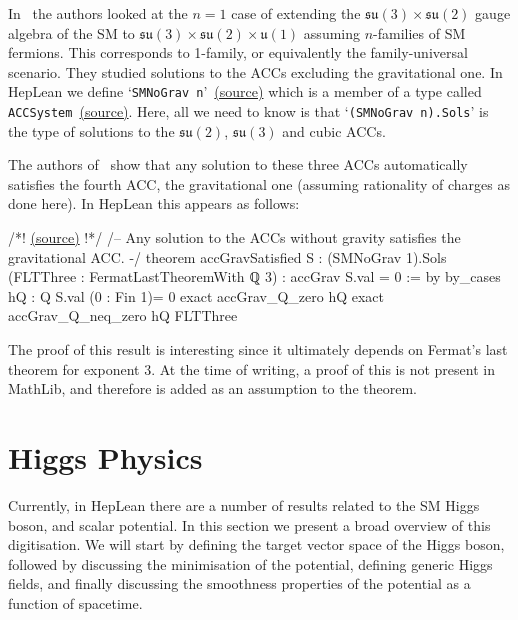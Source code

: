 \documentclass[a4paper, 11pt]{article}
\newcommand{\codeLink}[1]{
  \vspace{-0.5cm}\hfill\href{https://github.com/HEPLean/HepLean/blob/1b951994ae3d882242b02d23957ef1ee7fa05f3d/HepLean/#1}{(source)}
  }
\newcommand{\textLinkB}[1]{\href{https://github.com/HEPLean/HepLean/blob/1b951994ae3d882242b02d23957ef1ee7fa05f3d/HepLean/#1}{(source)}}
\begin{document}
In~\cite{LT19} the authors looked at the $n=1$ case of extending the $\mathfrak{su}(3)\times
\mathfrak{su}(2)$ gauge algebra of the SM to $\mathfrak{su}(3)\times \mathfrak{su}(2)
\times \mathfrak{u}(1)$ assuming $n$-families of SM fermions. This corresponds to 1-family, or
equivalently the family-universal scenario. They studied solutions to the ACCs excluding the
gravitational one. In HepLean we define  `\lstinline|SMNoGrav n|'~\textLinkB{AnomalyCancellation/SM/NoGrav/Basic.lean\#L21} which is a member of a type called
\lstinline|ACCSystem|~\textLinkB{AnomalyCancellation/Basic.lean\#L219}. Here, all we need to know is that  `\lstinline|(SMNoGrav n).Sols|'  is the type
of solutions to the $\mathfrak{su}(2)$, $\mathfrak{su}(3)$ and cubic ACCs.

The authors of~\cite{LT19}  show that any solution to these three ACCs automatically satisfies the fourth ACC, the gravitational one (assuming rationality of charges as done here). In HepLean this appears as follows: 
\begin{code}
/*!\codeLink{AnomalyCancellation/SM/NoGrav/One/Lemmas.lean\#L70}!*/
/-- Any solution to the ACCs without gravity satisfies
 the gravitational ACC.  -/
theorem accGravSatisfied {S : (SMNoGrav 1).Sols} (FLTThree : FermatLastTheoremWith ℚ 3) :
    accGrav S.val = 0 := by
  by_cases hQ : Q S.val (0 : Fin 1)= 0
  exact accGrav_Q_zero hQ
  exact accGrav_Q_neq_zero hQ FLTThree
\end{code}
The proof of this result is interesting since it ultimately depends on Fermat's last theorem for exponent $3$.  At the time of writing, a proof of this is not present in MathLib, and therefore is added as an assumption to the theorem.
\section{Higgs Physics}\label{sec:Higgs}
Currently, in HepLean there are a number of results related to the SM Higgs boson, and scalar potential. 
In this section we present a broad overview of this digitisation. 
We will start by defining the target vector space of the Higgs boson, followed by discussing the minimisation of the potential, defining generic Higgs fields, and finally discussing the smoothness properties of the potential as a function of spacetime.
\end{document}
